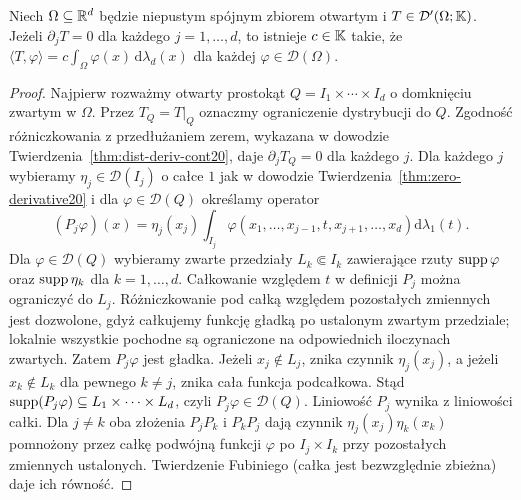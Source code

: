 \begin{twierdzenie}
\label{thm:zero-gradient20}
Niech $\Omega\subseteq\mathbb R^d$ będzie niepustym spójnym
zbiorem otwartym i $T\in\mathcal D'(\Omega;\mathbb K)$.
Jeżeli $\partial_jT=0$ dla każdego $j=1,\ldots,d$,
to istnieje $c\in\mathbb K$ takie, że
$\langle T,\varphi\rangle=c\int_\Omega\varphi(x)\,
\mathrm d\lambda_d(x)$ dla każdej $\varphi\in\mathcal D(\Omega)$.
\end{twierdzenie}
\begin{proof}
Najpierw rozważmy otwarty prostokąt
$Q=I_1\times\cdots\times I_d$ o domknięciu zwartym w $\Omega$.
Przez $T_Q=T|_Q$ oznaczmy ograniczenie dystrybucji do $Q$.
Zgodność różniczkowania z przedłużaniem zerem, wykazana
w dowodzie Twierdzenia~\ref{thm:dist-deriv-cont20},
daje $\partial_jT_Q=0$ dla każdego $j$.
Dla każdego $j$ wybieramy $\eta_j\in\mathcal D(I_j)$
o całce $1$ jak w dowodzie Twierdzenia~\ref{thm:zero-derivative20}
i dla $\varphi\in\mathcal D(Q)$ określamy operator
\[
 (P_j\varphi)(x)=\eta_j(x_j)
 \int_{I_j}\varphi(x_1,\ldots,x_{j-1},t,x_{j+1},\ldots,x_d)
 \mathrm d\lambda_1(t).
\]
Dla $\varphi\in\mathcal D(Q)$ wybieramy zwarte przedziały
$L_k\Subset I_k$ zawierające rzuty $\operatorname{supp}\varphi$
oraz $\operatorname{supp}\eta_k$ dla $k=1,\ldots,d$.
Całkowanie względem $t$ w definicji $P_j$ można ograniczyć
do $L_j$. Różniczkowanie pod całką względem pozostałych
zmiennych jest dozwolone, gdyż całkujemy funkcję gładką
po ustalonym zwartym przedziale; lokalnie wszystkie
pochodne są ograniczone na odpowiednich iloczynach zwartych.
Zatem $P_j\varphi$ jest gładka.
Jeżeli $x_j\notin L_j$, znika czynnik $\eta_j(x_j)$,
a jeżeli $x_k\notin L_k$ dla pewnego $k\ne j$, znika cała
funkcja podcałkowa. Stąd $\operatorname{supp}(P_j\varphi)\subseteq
L_1\times\cdots\times L_d$, czyli $P_j\varphi\in\mathcal D(Q)$.
Liniowość $P_j$ wynika z liniowości całki.
Dla $j\ne k$ oba złożenia $P_jP_k$ i $P_kP_j$ dają
czynnik $\eta_j(x_j)\eta_k(x_k)$ pomnożony przez całkę
podwójną funkcji $\varphi$ po $I_j\times I_k$ przy pozostałych
zmiennych ustalonych. Twierdzenie Fubiniego (całka jest
bezwzględnie zbieżna) daje ich równość.


\end{proof}
